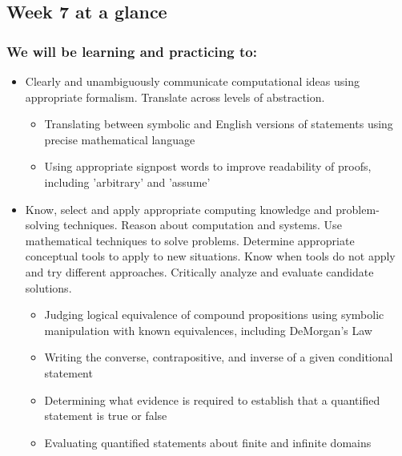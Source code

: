 \documentclass[12pt, oneside]{article}
\begin{document}
\begin{flushright}
\end{flushright} 
\subsection*{Week 7 at a glance}

\subsubsection*{We will be learning and practicing to:}
\begin{itemize}

\item Clearly and unambiguously communicate computational ideas using appropriate formalism. Translate across levels of abstraction.
\begin{itemize}
   \item Translating between symbolic and English versions of statements using precise mathematical language
    \item Using appropriate signpost words to improve readability of proofs, including 'arbitrary' and 'assume'
\end{itemize}

\item Know, select and apply appropriate computing knowledge and problem-solving techniques. Reason about computation and systems. Use mathematical techniques to solve problems. Determine appropriate conceptual tools to apply to new situations. Know when tools do not apply and try different approaches. Critically analyze and evaluate candidate solutions.
\begin{itemize}
    \item Judging logical equivalence of compound propositions using symbolic manipulation with known equivalences, including DeMorgan's Law
    \item Writing the converse, contrapositive, and inverse of a given conditional statement
    \item Determining what evidence is required to establish that a quantified statement is true or false
    \item Evaluating quantified statements about finite and infinite domains
\end{itemize}


\end{itemize}
\end{document}

